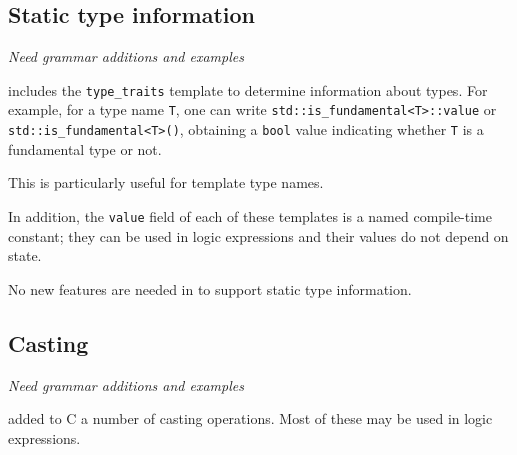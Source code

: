 \subsection{Static type information}

\emph{Need grammar additions and examples}

\lang{} includes the \lstinline|type_traits| template to determine information about types.
For example, for a type name \lstinline|T|, one can write
\lstinline|std::is_fundamental<T>::value| or
\lstinline|std::is_fundamental<T>()|, obtaining a 
\lstinline|bool| value indicating whether 
\lstinline|T| is a fundamental type or not.

This is particularly useful for template type names.

In addition, the \lstinline|value| field of each of these templates is a named \lang{} compile-time constant; they can be used in logic expressions and their values do not depend on state.

No new features are needed in \NAME{} to support static type information. 

\subsection{Casting}

\emph{Need grammar additions and examples}

\lang{} added to C a number of casting operations. Most of these may be 
used in logic expressions.


